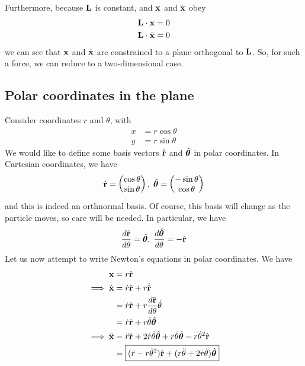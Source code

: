 \documentclass{../../template/note}
\begin{document}
    Furthermore, because \(\V L\) is constant, and \(\V x\) and \(\dot{\V x}\) obey
    \begin{align*}
        \V L \cdot \V x &= 0 \\
        \V L \cdot \dot{\V x} &= 0
    \end{align*}
    we can see that \(\V x\) and \(\dot{\V x}\) are constrained to a plane orthogonal to \(\V L\). So, for such a force, we can reduce to a two-dimensional case.
    
    \subsection{Polar coordinates in the plane}

    Consider coordinates \(r\) and \(\theta\), with
    \begin{align*}
        x &= r \cos \theta \\
        y &= r \sin \theta
    \end{align*}
    We would like to define some basis vectors \(\hvec r\) and \(\hvec \theta\) in polar coordinates. In Cartesian coordinates, we have
    \begin{align*}
        \hvec r = \begin{pmatrix}
         \cos \theta \\
         \sin \theta \\
        \end{pmatrix}, \; \hvec \theta = \begin{pmatrix}
         -\sin \theta \\
         \cos \theta \\
        \end{pmatrix}
    \end{align*}
    and this is indeed an orthnormal basis. Of course, this basis will change as the particle moves, so care will be needed. In particular, we have
    \begin{align*}
        \frac{d \hvec r}{d \theta} = \hvec \theta, \; \frac{d\hvec \theta}{d \theta} = -\hvec r
    \end{align*}
    Let us now attempt to write Newton's equations in polar coordinates. We have
    \begin{align*}
        \V x &= r \hvec r \\
        \implies \dot{\V x} &= \dot r \hvec r + r \dot{\hvec r} \\
        &= \dot r \hvec r + r \frac{d \hvec r}{d \theta} \dot{\theta} \\
        &= \dot r \hvec r + r \dot{\theta} \hvec{\theta} \\
        \implies \ddot{\V x} &= \ddot r \hvec r + 2 \dot r \dot{\theta} \hvec{\theta} + r \ddot{\theta} \hvec{\theta} - r \dot{\theta}^2 \hvec r \\
        &= \boxed{(\ddot r - r\dot{\theta}^2)\hvec r + (r \ddot \theta + 2 \dot r \dot \theta)\hvec \theta}
    \end{align*}
    
\end{document}
